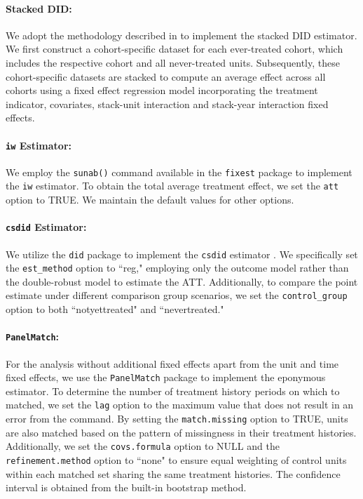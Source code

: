 \documentclass[12pt]{article}
\begin{document}
\paragraph*{Stacked DID:} We adopt the methodology described in \citet{bleiberg2021stackedev} to implement the stacked DID estimator. We first construct a cohort-specific dataset for each ever-treated cohort, which includes the respective cohort and all never-treated units. Subsequently, these cohort-specific datasets are stacked to compute an average effect across all cohorts using a fixed effect regression model incorporating the treatment indicator, covariates, stack-unit interaction and stack-year interaction fixed effects.

\paragraph*{\texttt{iw} Estimator:} We employ the \texttt{sunab()} command available in the \texttt{fixest} package to implement the \texttt{iw} estimator. 
To obtain the total average treatment effect, we set the \texttt{att} option to TRUE. We maintain the default values for other options.


\paragraph*{\texttt{csdid} Estimator:} We utilize the \texttt{did} package to implement the \texttt{csdid} estimator \citep{sant2021did}. We specifically set the \texttt{est\_method} option to ``reg," employing only the outcome model rather than the double-robust model to estimate the ATT. Additionally, to compare the point estimate under different comparison group scenarios, we set the \texttt{control\_group} option to both ``notyettreated" and ``nevertreated."


\paragraph*{\texttt{PanelMatch}:} For the analysis without additional fixed effects apart from the unit and time fixed effects, we use the \texttt{PanelMatch} package to implement the eponymous estimator. 
To determine the number of treatment history periods on which to matched, we set the \texttt{lag} option to the maximum value that does not result in an error from the command. By setting the \texttt{match.missing} option to TRUE, units are also matched based on the pattern of missingness in their treatment histories. Additionally, we set the \texttt{covs.formula} option to NULL and the \texttt{refinement.method} option to ``none" to ensure equal weighting of control units within each matched set sharing the same treatment histories. The confidence interval is obtained from the built-in bootstrap method.
\end{document}
